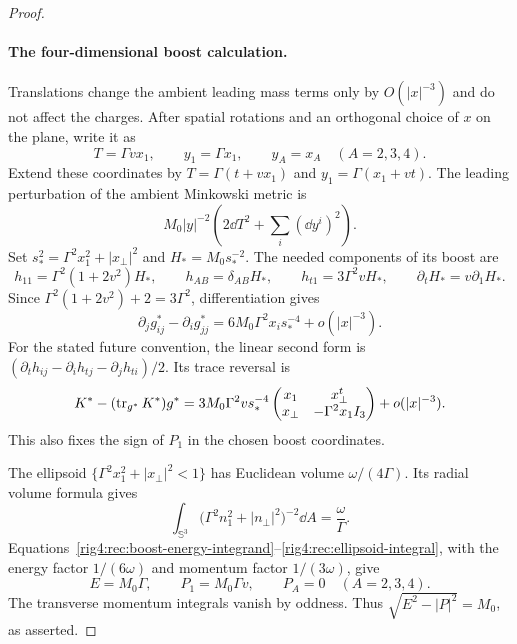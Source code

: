 \begin{proof}
\paragraph{The four-dimensional boost calculation.}
Translations change the ambient leading mass terms only by $O(|x|^{-3})$
and do not affect the charges.  After spatial rotations and an orthogonal
choice of $x$ on the plane, write it as
\[
 T=\Gamma v x_1,\qquad y_1=\Gamma x_1,\qquad y_A=x_A\quad(A=2,3,4).
\]
Extend these coordinates by
$T=\Gamma(t+vx_1)$ and $y_1=\Gamma(x_1+vt)$.
The leading perturbation of the ambient Minkowski metric is
\[
 M_0|y|^{-2}\left(2\dd T^2+\sum_i(\dd y^i)^2\right).
\]
Set $s_*^2=\Gamma^2x_1^2+|x_\perp|^2$ and $H_*=M_0s_*^{-2}$.
The needed components of its boost are
\[
 h_{11}=\Gamma^2(1+2v^2)H_*,\qquad
 h_{AB}=\delta_{AB}H_*,\qquad h_{t1}=3\Gamma^2vH_*,
 \qquad \partial_tH_*=v\partial_1H_*.
\]
Since $\Gamma^2(1+2v^2)+2=3\Gamma^2$, differentiation gives
\begin{equation}
 \partial_jg^*_{ij}-\partial_ig^*_{jj}
   =6M_0\Gamma^2x_i s_*^{-4}+o(|x|^{-3}).
 \label{rig4:rec:boost-energy-integrand}
\end{equation}
For the stated future convention, the linear second form is
$(\partial_th_{ij}-\partial_ih_{tj}-\partial_jh_{ti})/2$.  Its trace reversal
is
\begin{equation}
 K^*-(\operatorname{tr}_{g^*}K^*)g^*
 =3M_0\Gamma^2v s_*^{-4}
 \begin{pmatrix}
  x_1&x_\perp^t\\
  x_\perp&-\Gamma^2x_1I_3
 \end{pmatrix}
 +o(|x|^{-3}).
 \label{rig4:rec:boost-momentum-integrand}
\end{equation}
This also fixes the sign of $P_1$ in the chosen boost coordinates.

The ellipsoid
$\{\Gamma^2x_1^2+|x_\perp|^2<1\}$ has Euclidean volume
$\omega/(4\Gamma)$.  Its radial volume formula gives
\begin{equation}
 \int_{\mathbb S^3}
   \bigl(\Gamma^2n_1^2+|n_\perp|^2\bigr)^{-2}\dd A
 =\frac{\omega}{\Gamma}.
 \label{rig4:rec:ellipsoid-integral}
\end{equation}
Equations~\eqref{rig4:rec:boost-energy-integrand}--\eqref{rig4:rec:ellipsoid-integral},
with the energy factor $1/(6\omega)$ and momentum factor $1/(3\omega)$,
give
\begin{equation}
 E=M_0\Gamma,\qquad P_1=M_0\Gamma v,
 \qquad P_A=0\quad(A=2,3,4).
 \label{rig4:rec:boost-charges}
\end{equation}
The transverse momentum integrals vanish by oddness.  Thus
$\sqrt{E^2-|P|^2}=M_0$, as asserted.
\end{proof}

